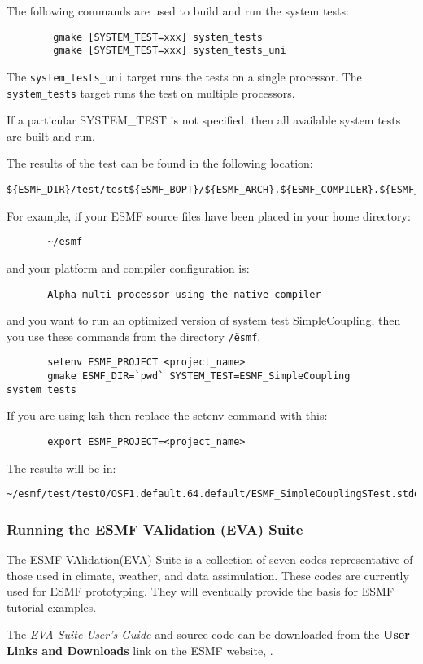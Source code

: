 The following commands are used to build and run the system tests:

\begin{verbatim}
        gmake [SYSTEM_TEST=xxx] system_tests
        gmake [SYSTEM_TEST=xxx] system_tests_uni
\end{verbatim}

The {\tt system\_tests\_uni} target runs the tests on a single processor. 
The {\tt system\_tests} target runs the test on multiple processors.

If a particular SYSTEM\_TEST is not specified, then all available system tests 
are built and run.

The results of the test can be found in the following location:
\begin{verbatim}
${ESMF_DIR}/test/test${ESMF_BOPT}/${ESMF_ARCH}.${ESMF_COMPILER}.${ESMF_PREC}.${ESMF_SITE}
\end{verbatim}

For example, if your ESMF source files have been placed in your home directory:
\begin{verbatim}
       ~/esmf
\end{verbatim}

and your platform and compiler configuration is:
\begin{verbatim}
       Alpha multi-processor using the native compiler
\end{verbatim}

and you want to run an optimized version of system test SimpleCoupling,
then you use these commands from the directory {\tt \~/esmf}. 
\begin{verbatim}
       setenv ESMF_PROJECT <project_name>
       gmake ESMF_DIR=`pwd` SYSTEM_TEST=ESMF_SimpleCoupling system_tests
\end{verbatim}

If you are using ksh then replace the setenv command with
this:

\begin{verbatim}
       export ESMF_PROJECT=<project_name>
\end{verbatim}

The results will be in:
\begin{verbatim}
~/esmf/test/testO/OSF1.default.64.default/ESMF_SimpleCouplingSTest.stdout
\end{verbatim}

\subsubsection{Running the ESMF VAlidation (EVA) Suite}
\label{EVATestDescription}

The ESMF VAlidation(EVA) Suite is a collection of seven codes
representative of those used in climate, weather, and data
assimulation. These codes are currently used for ESMF prototyping.
They will eventually provide the basis for ESMF tutorial examples.

The {\it EVA Suite User's Guide} and source code can be downloaded from the {\bf
User Links and Downloads} link on the ESMF website, 
.

